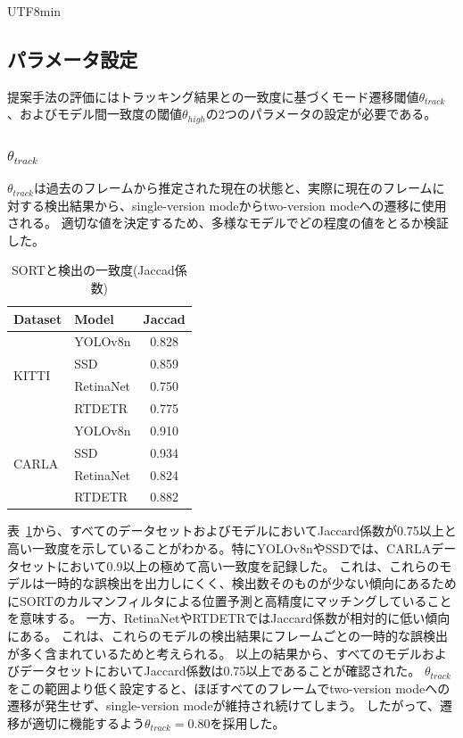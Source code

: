 \documentclass[conference, dvipdfmx]{IEEEtran}
\begin{document}
\begin{CJK}{UTF8}{min}
\subsection{パラメータ設定}
\label{parameter setting}
提案手法の評価にはトラッキング結果との一致度に基づくモード遷移閾値$\theta_{track}$、およびモデル間一致度の閾値$\theta_{high}$の2つのパラメータの設定が必要である。

\subsubsection{$\theta_{track}$}
\label{confidence threshold}
$\theta_{track}$は過去のフレームから推定された現在の状態と、実際に現在のフレームに対する検出結果から、single-version modeからtwo-version modeへの遷移に使用される。
適切な値を決定するため、多様なモデルでどの程度の値をとるか検証した。
\begin{table}[htbp]
    \centering
    \caption{SORTと検出の一致度(Jaccad係数)}
    \begin{tabular}{llc}
         \toprule
         Dataset & 
         Model & Jaccad \\
         \midrule
         \multirow{4}{*}{KITTI} 
         & YOLOv8n    & 0.828 \\
         & SSD        & 0.859 \\
         & RetinaNet  & 0.750 \\
         & RTDETR     & 0.775 \\
         \midrule
         \multirow{4}{*}{CARLA}
         & YOLOv8n    & 0.910 \\
         & SSD        & 0.934 \\
         & RetinaNet  & 0.824 \\
         & RTDETR     & 0.882 \\
         \bottomrule
    \end{tabular}
    \label{tab:SORTと検出の一致度}
\end{table}
表~\ref{tab:SORTと検出の一致度}から、すべてのデータセットおよびモデルにおいてJaccard係数が0.75以上と高い一致度を示していることがわかる。特にYOLOv8nやSSDでは、CARLAデータセットにおいて0.9以上の極めて高い一致度を記録した。
これは、これらのモデルは一時的な誤検出を出力しにくく、検出数そのものが少ない傾向にあるためにSORTのカルマンフィルタによる位置予測と高精度にマッチングしていることを意味する。
一方、RetinaNetやRTDETRではJaccard係数が相対的に低い傾向にある。
これは、これらのモデルの検出結果にフレームごとの一時的な誤検出が多く含まれているためと考えられる。
以上の結果から、すべてのモデルおよびデータセットにおいてJaccard係数は0.75以上であることが確認された。
$\theta_{track}$をこの範囲より低く設定すると、ほぼすべてのフレームでtwo-version modeへの遷移が発生せず、single-version modeが維持され続けてしまう。
したがって、遷移が適切に機能するよう$\theta_{track}=0.80$を採用した。


\end{CJK}
\end{document}

